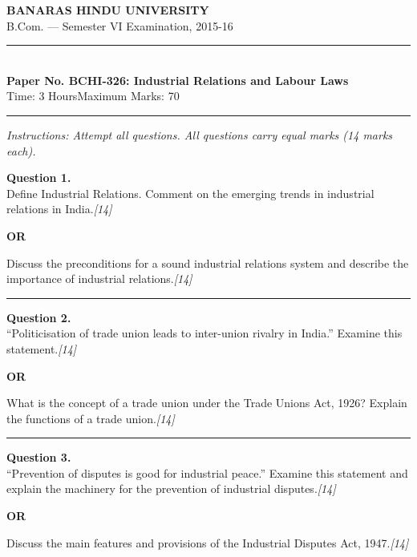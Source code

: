 \documentclass[11pt,a4paper]{article}
\newcommand{\pts}[1]{\hfill   \textit{[#1]}}
\begin{document}
\begin{center}
  {\large\bfseries BANARAS HINDU UNIVERSITY}\\[2pt]
  {\normalsize B.Com. --- Semester VI Examination, 2015-16}\\[6pt]
  \rule{0.8\linewidth}{0.5pt}\\[6pt]
  {\large\bfseries Paper No. BCHI-326: Industrial Relations and Labour Laws}\\[4pt]
  {\normalsize Time: 3 Hours\hfill Maximum Marks: 70}
\end{center}

\rule{\linewidth}{0.4pt}

\smallskip



\noindent   \textit{Instructions: Attempt all questions. All questions carry equal marks (14 marks each).}

\bigskip




\noindent   \textbf{Question 1.} \\
Define Industrial Relations. Comment on the emerging trends in industrial relations in India.\pts{14}

\centerline{   \textbf{OR}}

Discuss the preconditions for a sound industrial relations system and describe the importance of industrial relations.\pts{14}

\medskip\rule{\linewidth}{0.2pt}




\noindent   \textbf{Question 2.} \\
``Politicisation of trade union leads to inter-union rivalry in India.'' Examine this statement.\pts{14}

\centerline{   \textbf{OR}}

What is the concept of a trade union under the Trade Unions Act, 1926? Explain the functions of a trade union.\pts{14}

\medskip\rule{\linewidth}{0.2pt}




\noindent   \textbf{Question 3.} \\
``Prevention of disputes is good for industrial peace.'' Examine this statement and explain the machinery for the prevention of industrial disputes.\pts{14}

\centerline{   \textbf{OR}}

Discuss the main features and provisions of the Industrial Disputes Act, 1947.\pts{14}
\end{document}
